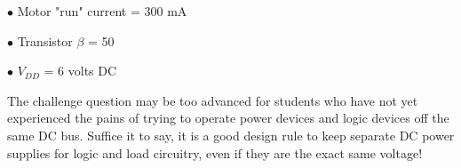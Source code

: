 \medskip
\item{$\bullet$} Motor "run" current = 300 mA
\item{$\bullet$} Transistor $\beta$ = 50
\item{$\bullet$} $V_{DD}$ = 6 volts DC
\medskip

The challenge question may be too advanced for students who have not yet experienced the pains of trying to operate power devices and logic devices off the same DC bus.  Suffice it to say, it is a good design rule to keep separate DC power supplies for logic and load circuitry, even if they are the exact same voltage!



